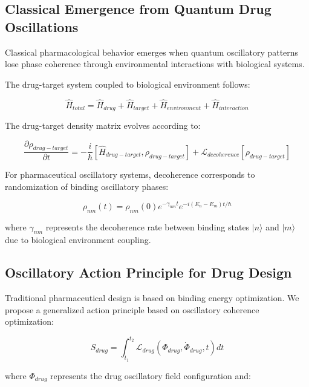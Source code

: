 \subsection{Classical Emergence from Quantum Drug Oscillations}

Classical pharmacological behavior emerges when quantum oscillatory patterns lose phase coherence through environmental interactions with biological systems.

The drug-target system coupled to biological environment follows:

\begin{equation}
\hat{H}_{total} = \hat{H}_{drug} + \hat{H}_{target} + \hat{H}_{environment} + \hat{H}_{interaction}
\end{equation}

The drug-target density matrix evolves according to:

\begin{equation}
\frac{\partial \rho_{drug-target}}{\partial t} = -\frac{i}{\hbar}[\hat{H}_{drug-target}, \rho_{drug-target}] + \mathcal{L}_{decoherence}[\rho_{drug-target}]
\end{equation}

For pharmaceutical oscillatory systems, decoherence corresponds to randomization of binding oscillatory phases:

\begin{equation}
\rho_{nm}(t) = \rho_{nm}(0) e^{-\gamma_{nm} t} e^{-i(E_n - E_m)t/\hbar}
\end{equation}

where $\gamma_{nm}$ represents the decoherence rate between binding states $|n\rangle$ and $|m\rangle$ due to biological environment coupling.

\subsection{Oscillatory Action Principle for Drug Design}

Traditional pharmaceutical design is based on binding energy optimization. We propose a generalized action principle based on oscillatory coherence optimization:

\begin{equation}
S_{drug} = \int_{t_1}^{t_2} \mathcal{L}_{drug}(\Phi_{drug}, \dot{\Phi}_{drug}, t) dt
\end{equation}

where $\Phi_{drug}$ represents the drug oscillatory field configuration and:

